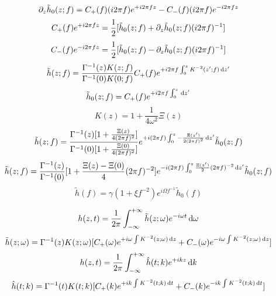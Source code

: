 \begin{equation}
    \partial_z\tilde{h}_0(z;f)=C_+(f)(i2\pi f)e^{+i2\pi fz}-C_-(f)(i2\pi f)e^{-i2\pi fz}
\end{equation}
\begin{equation}
    C_+(f)e^{+i2\pi fz}=\frac{1}{2}[\tilde{h}_0(z;f)+\partial_z\tilde{h}_0(z;f)(i2\pi f)^{-1}]
\end{equation}
\begin{equation}
    C_-(f)e^{-i2\pi fz}=\frac{1}{2}[\tilde{h}_0(z;f)-\partial_z\tilde{h}_0(z;f)(i2\pi f)^{-1}]
\end{equation}
\begin{equation}
    \tilde{h}(z;f)=\frac{\Gamma^{-1}(z)K(z;f)}{\Gamma^{-1}(0)K(0;f)}C_+(f)e^{+i2\pi f\int_0^z K^{-2}(z';f)\,\mathrm{d} z'}
\end{equation}
\begin{equation}
    \tilde{h}_0(z;f)=C_+(f)e^{+i2\pi f\int_0^z\,\mathrm{d} z'}
\end{equation}
\begin{equation}
    K(z)=1+\frac{1}{4\omega^2}\Xi(z)
\end{equation}
\begin{equation}
    \tilde{h}(z;f)=\frac{\Gamma^{-1}(z)[1+\frac{\Xi(z)}{4(2\pi f)^2}]}{\Gamma^{-1}(0)[1+\frac{\Xi(0)}{4(2\pi f)^2}]}e^{+i(2\pi f)\int_0^z -\frac{\Xi(z')}{2(2\pi f)^2}\,\mathrm{d} z'}\tilde{h}_0(z;f)
\end{equation}
\begin{equation}
    \tilde{h}(z;f)=\frac{\Gamma^{-1}(z)}{\Gamma^{-1}(0)}[1+\frac{\Xi(z)-\Xi(0)}{4}(2\pi f)^{-2}]e^{-i(2\pi f)\int_0^z\frac{\Xi(z')}{2}(2\pi f)^{-2}\,\mathrm{d} z'}\tilde{h}_0(z;f)
\end{equation}
\begin{equation}
    \tilde{h}(f)=\gamma(1+\xi f^{-2})e^{i\Omega f^{-1}}\tilde{h}_0(f)
\end{equation}

\begin{equation}
    h(z,t)=\frac{1}{2\pi}\int_{-\infty}^{+\infty}\tilde{h}(z;\omega)e^{-i\omega t}\,\mathrm{d} \omega
\end{equation}
\begin{equation}
    \tilde{h}(z;\omega)=\Gamma^{-1}(z)K(z;\omega)[C_+(\omega)e^{+i\omega\int K^{-2}(z;\omega)\,\mathrm{d} z}+C_-(\omega)e^{-i\omega\int K^{-2}(z;\omega)\,\mathrm{d} z}]
\end{equation}
\begin{equation}
    h(z,t)=\frac{1}{2\pi}\int_{-\infty}^{+\infty}\hat{h}(t;k)e^{+ikz}\,\mathrm{d} k
\end{equation}
\begin{equation}
    \hat{h}(t;k)=\Gamma^{-1}(t)K(t;k)[C_+(k)e^{+ik\int K^{-2}(t;k)\,\mathrm{d} t}+C_-(k)e^{-ik\int K^{-2}(t;k)\,\mathrm{d} t}]
\end{equation}

